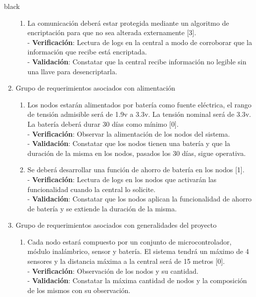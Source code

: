 \documentclass[11pt]{charter}
\begin{document}
\begin{consigna}{black}
\begin{enumerate}
\begin{enumerate}
	\item La comunicación deberá estar protegida mediante un algoritmo de encriptación para que no sea alterada externamente [3].
	\\ - \textbf{Verificación}: Lectura de logs en la central a modo de corroborar que la información que recibe está encriptada.
	\\ - \textbf{Validación}: Constatar que la central recibe información no legible sin una llave para desencriptarla.
	
	\end{enumerate}
\item Grupo de requerimientos asociados con alimentación
	\begin{enumerate}
	\item Los nodos estarán alimentados por batería como fuente eléctrica, el rango de tensión admisible será de 1.9v a 3.3v. La tensión nominal será de 3.3v. La batería deberá durar 30 días como mínimo [0].
	\\ - \textbf{Verificación}: Observar la alimentación de los nodos del sistema.
	\\ - \textbf{Validación}: Constatar que los nodos tienen una batería y que la duración de la misma en los nodos, pasados los 30 días, sigue operativa.
	
	\item Se deberá desarrollar una función de ahorro de batería en los nodos [1].
	\\ - \textbf{Verificación}: Lectura de logs en los nodos que activarán las funcionalidad cuando la central lo solicite.
	\\ - \textbf{Validación}: Constatar que los nodos aplican la funcionalidad de ahorro de batería y se extiende la duración de la misma.
	
	\end{enumerate}
\item Grupo de requerimientos asociados con generalidades del proyecto
	\begin{enumerate}
	\item Cada nodo estará compuesto por un conjunto de microcontrolador, módulo inalámbrico, sensor y batería. El sistema tendrá un máximo de 4 sensores y la distancia máxima a la central será de 15 metros [0].
	\\ - \textbf{Verificación}: Observación de los nodos y su cantidad.
	\\ - \textbf{Validación}: Constatar la máxima cantidad de nodos y la composición de los mismos con su observación.
	

\end{enumerate}
\end{enumerate}
\end{consigna}
\end{document}
